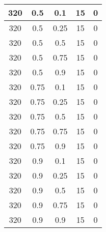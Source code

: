 \documentclass{bmstu}
\begin{document}
\begin{center}
\begin{longtable}[c]{|c|c|c|c|c|}
320 & 0.5 & 0.1 & 15 & 0 \\\hline
320 & 0.5 & 0.25 & 15 & 0 \\\hline
320 & 0.5 & 0.5 & 15 & 0 \\\hline
320 & 0.5 & 0.75 & 15 & 0 \\\hline
320 & 0.5 & 0.9 & 15 & 0 \\\hline
320 & 0.75 & 0.1 & 15 & 0 \\\hline
320 & 0.75 & 0.25 & 15 & 0 \\\hline
320 & 0.75 & 0.5 & 15 & 0 \\\hline
320 & 0.75 & 0.75 & 15 & 0 \\\hline
320 & 0.75 & 0.9 & 15 & 0 \\\hline
320 & 0.9 & 0.1 & 15 & 0 \\\hline
320 & 0.9 & 0.25 & 15 & 0 \\\hline
320 & 0.9 & 0.5 & 15 & 0 \\\hline
320 & 0.9 & 0.75 & 15 & 0 \\\hline
320 & 0.9 & 0.9 & 15 & 0 \\\hline
	\end{longtable}
\end{center}
\end{document}
